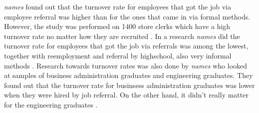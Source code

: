 \documentclass[Main.tex]{subfiles}
\begin{document}
\emph{names} found out that the turnover rate for employees that got the job via employee referral was higher than for the ones that came in via formal methods. However, the study was performed on 1400 store clerks which have a high turnover rate no matter how they are recruited \cite{second}. In a research \emph{names} did the turnover rate for employees that got the job via referrals was among the lowest, together with reemployment and referral by highschool, also very informal methods \cite{seventh}.
Research towards turnover rates was also done by \emph{names} who looked at samples of business administration graduates and engineering graduates. They found out that the turnover rate for businsess administration graduates was lower when they were hired by job referral. On the other hand, it didn't really matter for the engineering graduates \cite{eleventh}.


\end{document}
